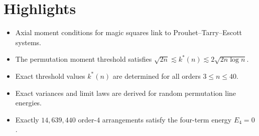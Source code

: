 \documentclass[11pt,a4paper]{article}
\begin{document}
\section*{Highlights}
\begin{itemize}
\item Axial moment conditions for magic squares link to Prouhet--Tarry--Escott systems.
\item The permutation moment threshold satisfies $\sqrt{2n} \lesssim k^*(n) \lesssim 2\sqrt{2n\log n}$.
\item Exact threshold values $k^*(n)$ are determined for all orders $3 \le n \le 40$.
\item Exact variances and limit laws are derived for random permutation line energies.
\item Exactly $14{,}639{,}440$ order-$4$ arrangements satisfy the four-term energy $E_4=0$.
\end{itemize}
\end{document}

